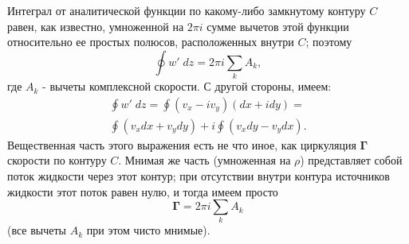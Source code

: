 Интеграл от аналитической функции по какому-либо замкнутому контуру $C$ равен,
как известно, умноженной на $2\pi i$ сумме вычетов этой функции относительно ее
простых полюсов, расположенных внутри $C$; поэтому
\[
   \oint w'\;dz = 2\pi i \sum_{k} A_k,
\]
где $A_k$ - вычеты комплексной скорости. С другой стороны, имеем:
\begin{eqnarray}
   \oint w'\;dz =
   \oint (v_x - i v_y)(dx + i dy) = \\
   \oint (v_x dx + v_y dy) + i \oint (v_x dy - v_y dx).
\end{eqnarray}
Вещественная часть этого выражения есть не что иное, как циркуляция
$\bm\Gamma$ скорости по контуру $C$. Мнимая же часть (умноженная на $\rho$)
представляет собой поток жидкости через этот контур; при отсутствии внутри
контура источников жидкости этот поток равен нулю, и тогда имеем просто
\begin{equation}
   \label{eq:10.15}
   \bm\Gamma = 2\pi i \sum_{k} A_k
\end{equation}
(все вычеты $A_k$ при этом чисто мнимые).

